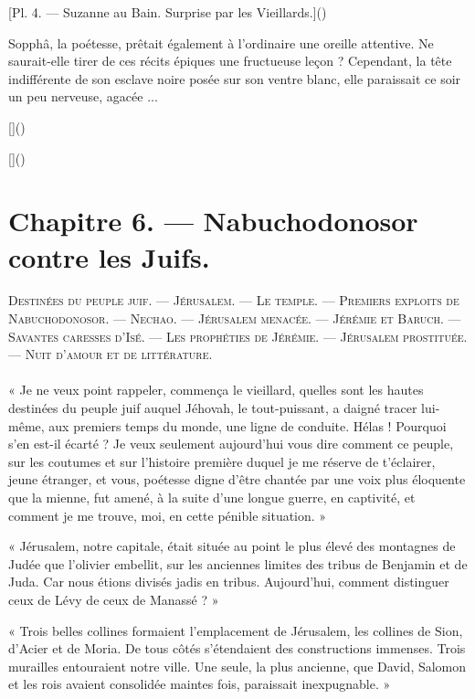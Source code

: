 \documentclass[a4paper, 11pt, oneside, polutonikogreek, french]{article}
\begin{document}
[Pl. 4. --- Suzanne au Bain. Surprise par les Vieillards.]()

Sopphâ, la poétesse, prêtait également à l'ordinaire une oreille attentive. Ne saurait-elle tirer de ces récits épiques une fructueuse leçon ? Cependant, la tête indifférente de son esclave noire posée sur son ventre blanc, elle paraissait ce soir un peu nerveuse, agacée ...

[]()

[]()
\clearpage
\section{Chapitre 6. --- Nabuchodonosor contre les Juifs.}
\begin{center}
\scshape
\small
Destinées du peuple juif. --- Jérusalem. --- Le temple. --- Premiers exploits de Nabuchodonosor. --- Nechao. --- Jérusalem menacée. --- Jérémie et Baruch. --- Savantes caresses d'Isé. --- Les prophéties de Jérémie. --- Jérusalem prostituée. --- Nuit d'amour et de littérature.
\end{center}
\paragraph{}
« Je ne veux point rappeler, commença le vieillard, quelles sont les hautes destinées du peuple juif auquel Jéhovah, le tout-puissant, a daigné tracer lui-même, aux premiers temps du monde, une ligne de conduite. Hélas ! Pourquoi s'en est-il écarté ? Je veux seulement aujourd'hui vous dire comment ce peuple, sur les coutumes et sur l'histoire première duquel je me réserve de t'éclairer, jeune étranger, et vous, poétesse digne d'être chantée par une voix plus éloquente que la mienne, fut amené, à la suite d'une longue guerre, en captivité, et comment je me trouve, moi, en cette pénible situation. »

« Jérusalem, notre capitale, était située au point le plus élevé des montagnes de Judée que l'olivier embellit, sur les anciennes limites des tribus de Benjamin et de Juda. Car nous étions divisés jadis en tribus. Aujourd'hui, comment distinguer ceux de Lévy de ceux de Manassé ? »

« Trois belles collines formaient l'emplacement de Jérusalem, les collines de Sion, d'Acier et de Moria. De tous côtés s'étendaient des constructions immenses. Trois murailles entouraient notre ville. Une seule, la plus ancienne, que David, Salomon et les rois avaient consolidée maintes fois, paraissait inexpugnable. »
\end{document}
